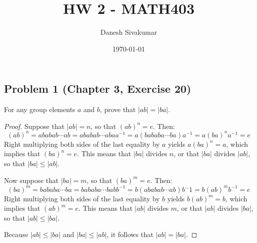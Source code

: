 \documentclass{article}
\title{HW 2 - MATH403}
\author{Danesh Sivakumar}
\date\today
\begin{document}
\maketitle 


\subsection*{Problem 1 (Chapter 3, Exercise 20)}
For any group elements $a$ and $b$, prove that $|ab| = |ba|$.
\begin{proof}

Suppose that $|ab| = n$, so that $(ab)^n = e$. Then:
\[ (ab)^n = ababab \cdots ab = ababab \cdots abaa^{-1} = a(bababa \cdots ba)a^{-1} = a(ba)^na^{-1} = e\]
Right multiplying both sides of the last equality by $a$ yields $a(ba)^n = a$, which implies that $(ba)^n = e$. This means that $|ba|$ divides $n$, or that $|ba|$ divides $|ab|$, so that $|ba| \leq |ab|$.

Now suppose that $|ba| = m$, so that $(ba)^m = e$. Then:
\[ (ba)^m = bababa \cdots ba = bababa \cdots babb^{-1} = b(ababab \cdots ab)b{^-1} = b(ab)^mb^{-1} = e\]
Right multiplying both sides of the last equality by $b$ yields $b(ab)^m = b$, which implies that $(ab)^m = e$. This means that $|ab|$ divides $m$, or that $|ab|$ divides $|ba|$, so that $|ab| \leq |ba|$.

Because $|ab| \leq |ba|$ and $|ba| \leq |ab|$, it follows that $|ab| = |ba|$.

\end{proof}
\end{document}
